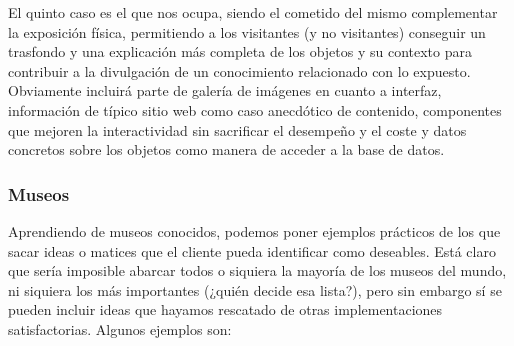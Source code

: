 \par El quinto caso es el que nos ocupa, siendo el cometido del mismo complementar la exposición física, permitiendo a los visitantes (y no visitantes) conseguir un trasfondo y una explicación más completa de los objetos y su contexto para contribuir a la divulgación de un conocimiento relacionado con lo expuesto. Obviamente incluirá parte de galería de imágenes en cuanto a interfaz, información de típico sitio web como caso anecdótico de contenido, componentes que mejoren la interactividad sin sacrificar el desempeño y el coste y datos concretos sobre los objetos como manera de acceder a la base de datos.

\subsubsection{Museos}

\par Aprendiendo de museos conocidos, podemos poner ejemplos prácticos de los que sacar ideas o matices que el cliente pueda identificar como deseables. Está claro que sería imposible abarcar todos o siquiera la mayoría de los museos del mundo, ni siquiera los más importantes (¿quién decide esa lista?), pero sin embargo sí se pueden incluir ideas que hayamos rescatado de otras implementaciones satisfactorias.
Algunos ejemplos son:

